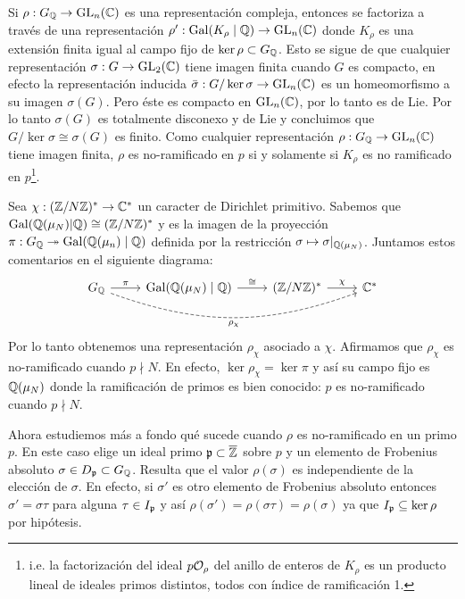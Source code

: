 \begin{nota}
  Si $\rho:G_{\mathbb{Q}}\rightarrow\mathrm{GL}_n(\mathbb{C})$ es una representaci\'on compleja, entonces se factoriza a trav\'es de una representaci\'on $\rho':\mathrm{Gal}(K_{\rho}\mid\mathbb{Q})\rightarrow\mathrm{GL}_n(\mathbb{C})$ donde $K_{\rho}$ es una extensi\'on finita igual al campo fijo de $\ker\rho\subset G_{\mathbb{Q}}$. Esto se sigue de que cualquier representaci\'on $\sigma:G\rightarrow \mathrm{GL}_2(\mathbb{C})$ tiene imagen finita cuando $G$ es compacto, en efecto la representaci\'on inducida $\bar{\sigma}:G/\ker\sigma\rightarrow\mathrm{GL}_n(\mathbb{C})$ es un homeomorfismo a su imagen $\sigma(G)$. Pero \'este es compacto en $\mathrm{GL}_n(\mathbb{C})$, por lo tanto es de Lie. Por lo tanto $\sigma(G)$ es totalmente disconexo y de Lie y concluimos que $G/\ker\sigma\cong\sigma(G)$ es finito. Como cualquier representaci\'on $\rho:G_{\mathbb{Q}}\rightarrow\mathrm{GL}_n(\mathbb{C})$ tiene imagen finita, $\rho$ es no-ramificado en $p$ si y solamente si  $K_{\rho}$ es no ramificado en $p$\footnote[2]{i.e. la factorizaci\'on del ideal $p\mathcal{O}_{\rho}$ del anillo de enteros de $K_{\rho}$ es un producto lineal de ideales primos distintos, todos con \'indice de ramificaci\'on 1.}.
\end{nota}

\begin{ejemplo}\label{ej:car_ciclo_modN}
  Sea $\chi:(\mathbb{Z}/N\mathbb{Z})^*\rightarrow\mathbb{C}^*$ un caracter de Dirichlet primitivo. Sabemos que $\mathrm{Gal}(\mathbb{Q}(\mu_N)|\mathbb{Q})\cong(\mathbb{Z}/N\mathbb{Z})^*$ y es la imagen de la proyecci\'on $\pi:G_{\mathbb{Q}}\twoheadrightarrow\mathrm{Gal}(\mathbb{Q}(\mu_n)\mid\mathbb{Q})$ definida por la restricci\'on $\sigma\mapsto\sigma|_{\mathbb{Q}(\mu_N)}$. Juntamos estos comentarios en el siguiente diagrama:
  \[
    \begin{tikzcd}
      \GQ \arrow[r,"\pi"] \arrow[rrr,dashed,bend right=20,"\rho_{\chi}"']&
      \Gal(\QQ(\mu_N)\mid\QQ) \arrow[r,"\cong"] &
      (\ZZ/N\ZZ)^* \arrow[r,"\chi"] &
      \CC^*
    \end{tikzcd}
  \]
  Por lo tanto obtenemos una representaci\'on $\rho_{\chi}$ asociado a $\chi$. Afirmamos que $\rho_{\chi}$ es no-ramificado cuando $p\nmid N$. En efecto, $\ker\rho_{\chi}=\ker\pi$ y as\'i su campo fijo es $\mathbb{Q}(\mu_N)$ donde la ramificaci\'on de primos es bien  conocido: $p$ es no-ramificado cuando $p\nmid N$.
\end{ejemplo}

Ahora estudiemos m\'as a fondo qu\'e sucede cuando $\rho$ es no-ramificado en un primo $p$. En este caso elige un ideal primo $\mathfrak{p}\subset\overline{\mathbb{Z}}$
sobre $p$ y un elemento de Frobenius absoluto $\sigma\in D_{\mathfrak{p}}\subset G_{\mathbb{Q}}$. Resulta que el valor $\rho(\sigma)$ es independiente de la elecci\'on de $\sigma$. En efecto, si $\sigma'$ es otro elemento de Frobenius absoluto entonces $\sigma'=\sigma\tau$ para alguna $\tau\in I_{\mathfrak{p}}$ y as\'i $\rho(\sigma')=\rho(\sigma\tau)=\rho(\sigma)$ ya que $I_{\mathfrak{p}}\subseteq\ker\rho$ por hip\'otesis.

